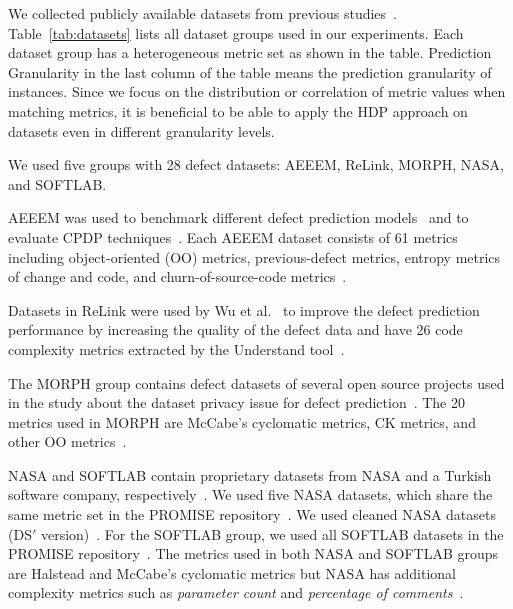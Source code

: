 We collected publicly available datasets from previous
studies~\cite{DAmbros12,Nam13,Peters12,Turhan09,Wu11}.
Table~\ref{tab:datasets} lists all dataset groups used in our experiments. Each
dataset group has a heterogeneous metric set as shown in the table.
Prediction Granularity in the last column of the table means the prediction
granularity of instances. Since we focus on the distribution or correlation of
metric values when matching metrics, it is beneficial to be able to
apply the HDP approach on datasets even in different granularity levels.

% 

We used five groups with 28 defect datasets: AEEEM, ReLink, MORPH, NASA,
and SOFTLAB.

AEEEM was used to benchmark different defect
prediction models~\cite{DAmbros12} and to evaluate CPDP
techniques~\cite{He14,Nam13}.
Each AEEEM dataset consists of 61 metrics including object-oriented (OO) metrics,
previous-defect metrics, entropy metrics of change and code, and churn-of-source-code
metrics~\cite{DAmbros12}.

Datasets in ReLink were used by Wu et
al.~\cite{Wu11} to improve the defect prediction performance by increasing the quality of the
defect data and have 26 code complexity metrics extracted by the Understand
tool~\cite{Understand}.

The MORPH group contains defect datasets of several open source projects used in
the study about the dataset privacy issue for defect prediction~\cite{Peters12}.
The 20 metrics used in MORPH are McCabe's cyclomatic metrics, CK metrics, and
other OO metrics~\cite{Peters12}.

NASA and SOFTLAB contain proprietary
datasets from NASA and a Turkish software company, respectively~\cite{Turhan09}.
We used five NASA datasets, which share the same metric set in the PROMISE
repository~\cite{promise12,Shepperd13}. We used cleaned NASA datasets (DS$'$ version)~\cite{Shepperd13}.
For the SOFTLAB group, we used all SOFTLAB datasets in the PROMISE
repository~\cite{promise12}. The metrics used in both NASA and SOFTLAB groups
are Halstead and McCabe's cyclomatic metrics but NASA has additional
 complexity metrics such as {\em parameter count} and {\em percentage of comments}~\cite{promise12}.

